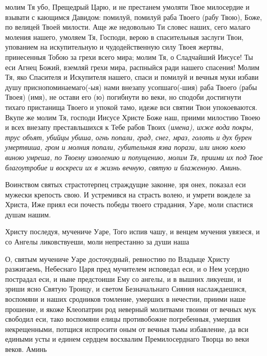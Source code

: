 молим Тя убо, Прещедрый Царю, и не престанем умоляти Твое милосердие и взывати с кающимся Давидом: помилуй, помилуй раба Твоего (рабу Твою), Боже, по велицей Твоей милости. Аще же недовольно Ти словес наших, сего малаго моления нашего, умоляем Тя, Господи, верою в спасительныя заслуги Твои, упованием на искупительную и чудодейственную силу Твоея жертвы, принесенныя Тобою за грехи всего мира; молим Тя, о Сладчайший Иисусе! Ты еси Агнец Божий, вземляй грехи мира, распныйся ради нашего спасения! Молим Тя, яко Спасителя и Искупителя нашего, спаси и помилуй и вечныя муки избави душу приснопоминаемаго(-ыя) нами внезапу усопшаго(-шия) раба Твоего (рабы Твоея) (имя), не остави его (ю) погибнути во веки, но сподоби достигнути тихаго пристанища Твоего и упокой тамо, идеже вси святии Твои упокоеваются. Вкупе же молим Тя, господи Иисусе Христе Боже наш, приими милостию Твоею и всех внезапу преставльшихся к Тебе рабов Твоих (\itshape имена\normalfont{}), ихже вода покры, трус объят, убийцы убиша, огнь попали, град, снег, мраз, голоть и дух бурен умертвиша, гром и молния попали, губительная язва порази, или иною коею виною умреша, по Твоему изволению и попущению, молим Тя, приими их под Твое благоутробие и воскреси их в жизнь вечную, святую и блаженную. Аминь.
\mychapterending

 






Воинством святых страстотерпец страждущие законне, зря онех, показал еси мужески крепость свою. И устремився на страсть волею, и умрети вожделе за Христа, Иже приял еси почесть победы твоего страдания, Уаре, моли спастися душам нашим.




Христу последуя, мучениче Уаре, Того испив чашу, и венцем мучения увязеся, и со Ангелы ликовствуеши, моли непрестанно за души наша




О, святым мучениче Уаре досточудный, ревностию по Владыце Христу разжигаемь, Небеснаго Царя пред мучителем исповедал еси, и о Нем усердно пострадал еси, и ныне предстоиши Ему со ангелы, и в вышних ликуеши, и зриши ясно Святую Троицу, и светом Безначальнаго Сияния наслаждаешися, воспомяни и наших сродников томление, умерших в нечестии, приими наше прошение, и якоже Клеопатрин род неверный молитвами твоими от вечных мук свободил еси, тако воспомяни елицы противобожне погребенныя, умершия некрещенными, потщися испросити оным от вечныя тьмы избавление, да вси едиными усты и единем сердцем восхвалим Премилосерднаго Творца во веки веков. Аминь
\mychapterending

